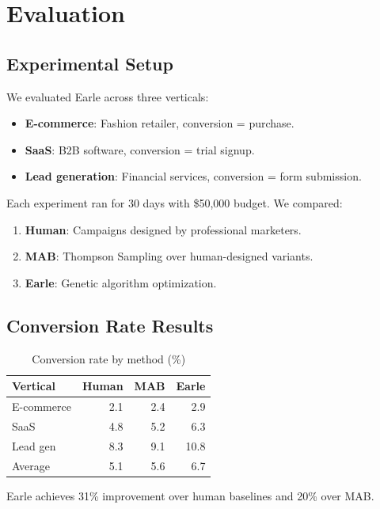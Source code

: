 \section{Evaluation}


\subsection{Experimental Setup}

We evaluated Earle across three verticals:

\begin{itemize}
\item \textbf{E-commerce}: Fashion retailer, conversion = purchase.
\item \textbf{SaaS}: B2B software, conversion = trial signup.
\item \textbf{Lead generation}: Financial services, conversion = form submission.
\end{itemize}

Each experiment ran for 30 days with \$50,000 budget. We compared:

\begin{enumerate}
\item \textbf{Human}: Campaigns designed by professional marketers.
\item \textbf{MAB}: Thompson Sampling over human-designed variants.
\item \textbf{Earle}: Genetic algorithm optimization.
\end{enumerate}

\subsection{Conversion Rate Results}

\begin{table}[h]
\centering
\caption{Conversion rate by method (\%)}
\label{tab:cvr}
\begin{tabular}{lrrr}
\hline
Vertical & Human & MAB & Earle \\
\hline
E-commerce & 2.1 & 2.4 & 2.9 \\
SaaS & 4.8 & 5.2 & 6.3 \\
Lead gen & 8.3 & 9.1 & 10.8 \\
\hline
Average & 5.1 & 5.6 & 6.7 \\
\hline
\end{tabular}
\end{table}

Earle achieves 31\% improvement over human baselines and 20\% over MAB.

